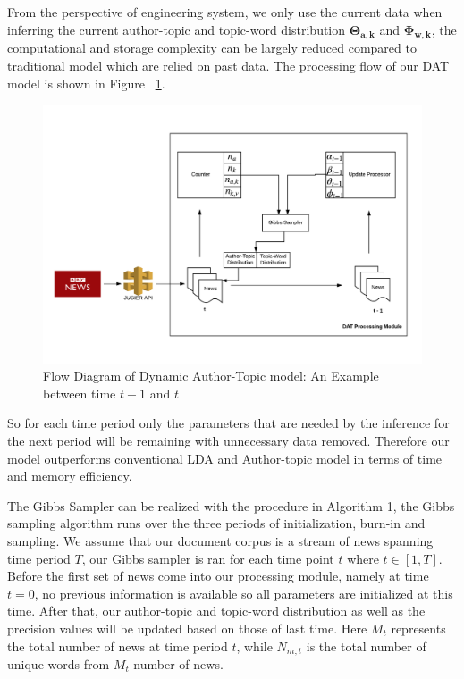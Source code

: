 From the perspective of engineering system, we only use the current data when inferring the current author-topic and topic-word distribution $\boldsymbol{\Theta_{a,k}}$ and $\boldsymbol{\Phi_{w,k}}$, the computational and storage complexity can be largely reduced compared to traditional model which are relied on past data. The processing flow of our DAT model is shown in Figure ~\ref{fig:flow}. 


\begin{figure}[h]
\centering
\includegraphics[width=1.1\textwidth]{figures/model_description.png}
\caption{Flow Diagram of Dynamic Author-Topic model: An Example between time $t-1$ and $t$}
\label{fig:flow}
\end{figure}

So for each time period only the parameters that are needed by the inference for the next period will be remaining with unnecessary data removed. Therefore our model outperforms conventional LDA and Author-topic model in terms of time and memory efficiency.

The Gibbs Sampler can be realized with the procedure in Algorithm 1, the Gibbs sampling algorithm runs over the three periods of initialization, burn-in and sampling. We assume that our document corpus is a stream of news spanning time period $T$, our Gibbs sampler is ran for each time point $t$ where $t \in [1,T]$. Before the first set of news come into our processing module, namely at time $t = 0$, no previous information is available so all parameters are initialized at this time. After that, our author-topic and topic-word distribution as well as the precision values will be updated based on those of last time. Here $M_t$ represents the total number of news at time period $t$, while $N_{m,t}$ is the total number of unique words from $M_t$ number of news.

